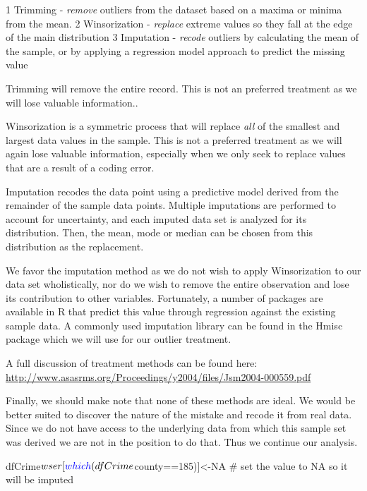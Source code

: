 \documentclass[]{article}
\newenvironment{Shaded}{}{}
\newcommand{\CommentTok}[1]{\textcolor[rgb]{0.00,0.50,0.00}{#1}}
\newcommand{\DecValTok}[1]{#1}
\newcommand{\KeywordTok}[1]{\textcolor[rgb]{0.00,0.00,1.00}{#1}}
\newcommand{\NormalTok}[1]{#1}
\newcommand{\OperatorTok}[1]{#1}
\newcommand{\OtherTok}[1]{\textcolor[rgb]{1.00,0.25,0.00}{#1}}
\begin{document}
1 Trimming - \emph{remove} outliers from the dataset based on a maxima
or minima from the mean. 2 Winsorization - \emph{replace} extreme values
so they fall at the edge of the main distribution 3 Imputation -
\emph{recode} outliers by calculating the mean of the sample, or by
applying a regression model approach to predict the missing value

Trimming will remove the entire record. This is not an preferred
treatment as we will lose valuable information..

Winsorization is a symmetric process that will replace \emph{all} of the
smallest and largest data values in the sample. This is not a preferred
treatment as we will again lose valuable information, especially when we
only seek to replace values that are a result of a coding error.

Imputation recodes the data point using a predictive model derived from
the remainder of the sample data points. Multiple imputations are
performed to account for uncertainty, and each imputed data set is
analyzed for its distribution. Then, the mean, mode or median can be
chosen from this distribution as the replacement.

We favor the imputation method as we do not wish to apply Winsorization
to our data set wholistically, nor do we wish to remove the entire
observation and lose its contribution to other variables. Fortunately, a
number of packages are available in R that predict this value through
regression against the existing sample data. A commonly used imputation
library can be found in the Hmisc package which we will use for our
outlier treatment.

A full discussion of treatment methods can be found here:
\url{http://www.asasrms.org/Proceedings/y2004/files/Jsm2004-000559.pdf}

Finally, we should make note that none of these methods are ideal. We
would be better suited to discover the nature of the mistake and recode
it from real data. Since we do not have access to the underlying data
from which this sample set was derived we are not in the position to do
that. Thus we continue our analysis.

\begin{Shaded}
\begin{Highlighting}[]
\NormalTok{dfCrime}\OperatorTok{$}\NormalTok{wser[}\KeywordTok{which}\NormalTok{(dfCrime}\OperatorTok{$}\NormalTok{county}\OperatorTok{==}\DecValTok{185}\NormalTok{)]<-}\OtherTok{NA} \CommentTok{# set the value to NA so it will be imputed}
\end{Highlighting}
\end{Shaded}
\end{document}
